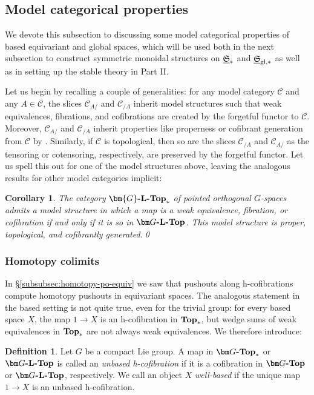 \documentclass[reqno]{memo-l}
\theoremstyle{mythm}
\newtheorem{cor}[thm]{Corollary}
\theoremstyle{definition}
\newtheorem{definition}[thm]{Definition}
\numberwithin{equation}{section}
\newcommand{\Cc}{{\mathcal{C}}}
\newcommand{\gl}{\textup{gl}}
\newcommand{\cat}[1]{\textbf{\textup{#1}}}
\newcommand{\ulhelper}[2]{\underline{\setbox0=\hbox{$#1#2$}\dp0=0.4pt \box0\relax}}
\newcommand{\ul}[1]{{\mathpalette\ulhelper{#1}}\hbox{\rule[-2pt]{0pt}{0pt}}}
\newcommand{\myS}{{{\mathfrak S\kern-.4pt}}}
\begin{document}
\subsection{Model categorical properties} We devote this subsection to discussing some model categorical properties of based equivariant and global spaces, which will be used both in the next subsection to construct symmetric monoidal structures on $\ul\myS_*$ and $\ul\myS_{\gl,*}$ as well as in setting up the stable theory in Part II.

Let us begin by recalling a couple of generalities: for any model category $\Cc$ and any $A\in\Cc$, the slices $\Cc_{A/}$ and $\Cc_{/A}$ inherit model structures such that weak equivalences, fibrations, and cofibrations are created by the forgetful functor to $\Cc$. Moreover, $\Cc_{A/}$ and $\Cc_{/A}$ inherit properties like properness or cofibrant generation from $\Cc$ by \cite{hirschhorn-slice}. Similarly, if $\Cc$ is topological, then so are the slices $\Cc_{/A}$ and $\Cc_{A/}$ as the tensoring or cotensoring, respectively, are preserved by the forgetful functor. Let us spell this out for one of the model structures above, leaving the analogous results for other model categories implicit:

\begin{cor}
    The category $\cat{$\bm{G}$-$\cat{L}$-Top}_*$ of pointed orthogonal $G$-spaces admits a model structure in which a map is a weak equivalence, fibration, or cofibration if and only if it is so in $\cat{$\bm G$-$\cat{L}$-Top}$. This model structure is proper, topological, and cofibrantly generated.\qed
\end{cor}

\medskip
\subsubsection{Homotopy colimits} In §\ref{subsubsec:homotopy-po-equiv} we saw that pushouts along h-cofibrations compute homotopy pushouts in equivariant spaces. The analogous statement in the based setting is not quite true, even for the trivial group: for every based space $X$, the map $1\to X$ is an h-cofibration in $\cat{Top}_*$, but wedge sums of weak equivalences in $\cat{Top}_*$ are not always weak equivalences. We therefore introduce:

\begin{definition}
    Let $G$ be a compact Lie group. A map in $\cat{$\bm G$-Top}_*$ or $\cat{$\bm G$-$\cat{L}$-Top}$ is called an \emph{unbased h-cofibration} if it is a cofibration in $\cat{$\bm G$-Top}$ or $\cat{$\bm G$-$\cat{L}$-Top}$, respectively. We call an object $X$ \emph{well-based} if the unique map $1\to X$ is an unbased h-cofibration. 
\end{definition}
\end{document}

